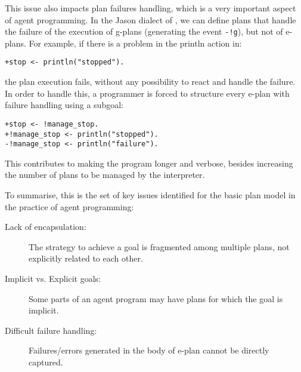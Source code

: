 This issue also impacts  plan failures handling, which is a very
important aspect of agent programming.
%
In the Jason dialect of {\asl}, we can define plans that handle the
failure of the execution of g-plans (generating the event
\texttt{-!g}), but not of e-plans.
%
For example, if there is a problem in the println action in:

\begin{small}
\begin{verbatim}
+stop <- println("stopped").
\end{verbatim}
\end{small}

\noindent the plan execution fails, without any possibility to react
and handle the failure.
%
In order to handle this, a programmer is forced to structure every
e-plan with failure handling using a subgoal:

\begin{small}
\begin{verbatim}
+stop <- !manage_stop.
+!manage_stop <- println("stopped").
-!manage_stop <- println("failure").
\end{verbatim}
\end{small}

\noindent This contributes to making the program longer and verbose,
besides increasing the number of plans to be managed by the
interpreter.


\bigskip

To summarise, this is the set of key issues identified for the basic
plan model in the practice of agent programming:
%
\begin{description}
%
\item[Lack of encapsulation:] The strategy to achieve a goal is
  fragmented among multiple plans, not explicitly related to each
  other.
%
\item[Implicit vs. Explicit goals:] Some parts of an agent program may
  have plans for which the goal is implicit.
%
\item[Difficult failure handling:] Failures/errors generated in the
  body of e-plan cannot be directly captured.
%
\end{description}



